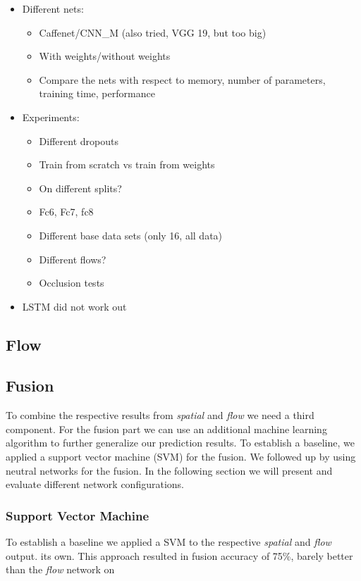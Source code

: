 \begin{itemize}
	\item
		Different nets:
		\begin{itemize}
			\item Caffenet/CNN\_M (also tried, VGG 19, but too big)
			\item With weights/without weights
			\item Compare the nets with respect to memory, number of parameters, training time, performance
		\end{itemize}
	\item
		Experiments:
		\begin{itemize}
			\item Different dropouts
			\item Train from scratch vs train from weights
			\item On different splits?
			\item Fc6, Fc7, fc8
			\item Different base data sets (only 16, all data)
			\item Different flows?
			\item Occlusion tests
		\end{itemize}
	\item
		LSTM did not work out
\end{itemize}


\subsection{Flow}
\label{subsec:flow}



\subsection{Fusion}
\label{subsec:fusion}

To combine the respective results from \emph{spatial} and \emph{flow} we need a third component.
For the fusion part we can use an additional machine learning algorithm to further generalize our prediction results.
To establish a baseline, we applied a support vector machine (SVM) for the fusion.
We followed up by using neutral networks for the fusion.
In the following section we will present and evaluate different network configurations.

\subsubsection{Support Vector Machine}
To establish a baseline we applied a SVM to the respective \emph{spatial} and \emph{flow} output. 
its own.
This approach resulted in fusion accuracy of 75\%, barely better than the \emph{flow} network on 

